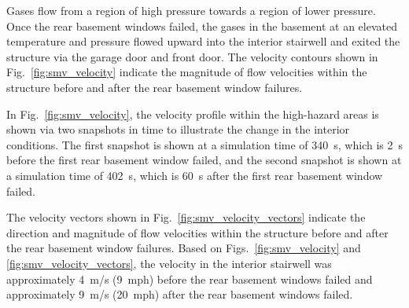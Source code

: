 \documentclass[12pt,oneside]{book}
\begin{document}
Gases flow from a region of high pressure towards a region of lower pressure. Once the rear basement windows failed, the gases in the basement at an elevated temperature and pressure flowed upward into the interior stairwell and exited the structure via the garage door and front door. The velocity contours shown in Fig.~\ref{fig:smv_velocity} indicate the magnitude of flow velocities within the structure before and after the rear basement window failures.

In Fig.~\ref{fig:smv_velocity}, the velocity profile within the high-hazard areas is shown via two snapshots in time to illustrate the change in the interior conditions. The first snapshot is shown at a simulation time of 340~s, which is 2~s before the first rear basement window failed, and the second snapshot is shown at a simulation time of 402~s, which is 60~s after the first rear basement window failed.

The velocity vectors shown in Fig.~\ref{fig:smv_velocity_vectors} indicate the direction and magnitude of flow velocities within the structure before and after the rear basement window failures. Based on Figs.~\ref{fig:smv_velocity} and \ref{fig:smv_velocity_vectors}, the velocity in the interior stairwell was approximately 4~m/s (9~mph) before the rear basement windows failed and approximately 9~m/s (20~mph) after the rear basement windows failed.
\end{document}
